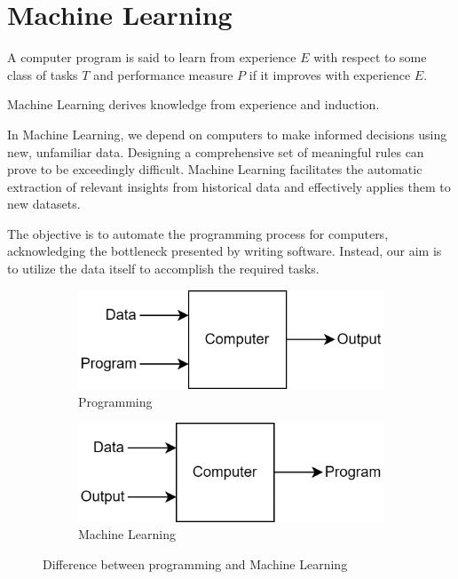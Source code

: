 \section{Machine Learning}

\begin{definition}
    A computer program is said to learn from experience $E$ with respect to some class of tasks $T$ and performance measure $P$ if it improves with experience $E$. 
\end{definition}

Machine Learning derives knowledge from experience and induction.

In Machine Learning, we depend on computers to make informed decisions using new, unfamiliar data. 
Designing a comprehensive set of meaningful rules can prove to be exceedingly difficult. 
Machine Learning facilitates the automatic extraction of relevant insights from historical data and effectively applies them to new datasets.

The objective is to automate the programming process for computers, acknowledging the bottleneck presented by writing software.
Instead, our aim is to utilize the data itself to accomplish the required tasks.

\begin{figure}[H]
    \centering
    \begin{subfigure}{0.49\textwidth}
        \centering
        \includegraphics[width=0.9\linewidth]{images/program.png} 
        \caption{Programming}
    \end{subfigure}
    \begin{subfigure}{0.49\textwidth}
        \centering
        \includegraphics[width=0.9\linewidth]{images/learning.png}
        \caption{Machine Learning}
    \end{subfigure}
    \caption{Difference between programming and Machine Learning}
\end{figure}

